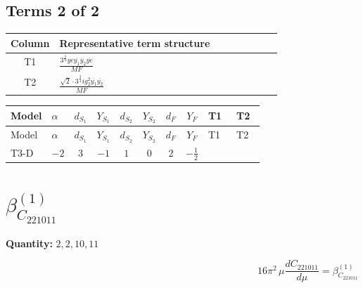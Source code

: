 \documentclass[8pt]{article}
\begin{document}
\begin{landscape}
\subsection*{Terms 2 of 2}
\begin{center}
\begin{tabular}{@{}c >{\raggedright\arraybackslash}p{0.82\linewidth}@{}}
\toprule
Column & Representative term structure \\
\midrule
T1 & \(\displaystyle \frac{3^{\frac{3}{4}} ye \overline{y_{1}} \overline{y_{2}} \overline{ye}}{MF}\) \\
\midrule
T2 & \(\displaystyle \frac{\sqrt{2} \cdot 3^{\frac{3}{4}} i g_{2}^{2} \overline{y_{1}} \overline{y_{2}}}{MF}\) \\
\midrule
\bottomrule
\end{tabular}
\end{center}
\smallskip
\tiny
\begin{longtable}{@{}llcccccc >{\raggedright\arraybackslash}p{0.21\linewidth} >{\raggedright\arraybackslash}p{0.21\linewidth}@{}}
\toprule
Model & $\alpha$ & $d_{S_1}$ & $Y_{S_1}$ & $d_{S_2}$ & $Y_{S_2}$ & $d_F$ & $Y_F$ & T1 & T2 \\
\midrule
\endfirsthead
\toprule
Model & $\alpha$ & $d_{S_1}$ & $Y_{S_1}$ & $d_{S_2}$ & $Y_{S_2}$ & $d_F$ & $Y_F$ & T1 & T2 \\
\midrule
\endhead
T3-D & $-2$ & $3$ & $-1$ & $1$ & $0$ & $2$ & $-\frac{1}{2}$ & \scriptsize\adjustbox{max width=\linewidth}{$\begin{gathered} - \frac{3^{\frac{3}{4}} ye \overline{y_{1}} \overline{y_{2}} \overline{ye}}{12 MF}\end{gathered}$} & \scriptsize\adjustbox{max width=\linewidth}{$\begin{gathered} - \frac{\sqrt{2} \cdot 3^{\frac{3}{4}} i g_{2}^{2} \overline{y_{1}} \overline{y_{2}}}{3 MF}\end{gathered}$} \\
\midrule
\bottomrule
\end{longtable}
\clearpage
\section*{$\beta_{C_{221011}}^{(1)}$}
\noindent\textbf{Quantity: }$\mathrm{2,2,10,11}$\par\smallskip
\[16\pi^2\,\mu\frac{d C_{221011}}{d\mu}=\beta_{C_{221011}}^{(1)}\]

\end{landscape}
\end{document}
